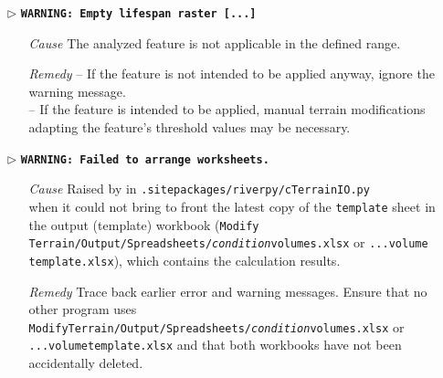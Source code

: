 \begin{itemize}
	\item[$\triangleright$]\textbf{\texttt{WARNING: Empty lifespan raster [...]}}
	\begin{itemize}
		\item[\textit{Cause}\hspace{0.27cm}] The analyzed feature is not applicable in the defined range.
		\item[\textit{Remedy}] -- If the feature is not intended to be applied anyway, ignore the warning message.\\
							-- If the feature is intended to be applied, manual terrain modifications adapting the feature's threshold values may be necessary.\\
	\end{itemize}
	\item[]
	
	\item[$\triangleright$]\textbf{\texttt{WARNING: Failed to arrange worksheets.}}
	\begin{itemize}
		\item[\textit{Cause}\hspace{0.27cm}] Raised by  in \texttt{.site{\myUnderscore}packages/riverpy/cTerrainIO.py}\\when it could not bring to front the latest copy of the \texttt{template} sheet in the output (template) workbook (\texttt{Modify Terrain/Output/Spreadsheets/\textit{condition}{\myUnderscore}volumes.xlsx} or \texttt{...volume{\myUnderscore}}\\\texttt{template.xlsx}), which contains the calculation results.
		\item[\textit{Remedy}] Trace back earlier error and warning messages. Ensure that no other program uses \texttt{ModifyTerrain/Output/Spreadsheets/\textit{condition}{\myUnderscore}volumes.xlsx} or \texttt{...volume{\myUnderscore}template.xlsx} and that both workbooks have not been accidentally deleted.\\
	\end{itemize}
	

\end{itemize}
